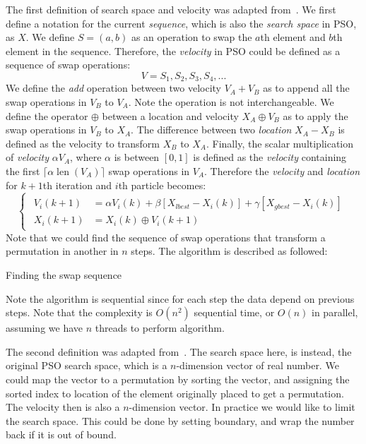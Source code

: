 \documentclass{article}
\begin{document}
The first definition of search space and velocity was adapted from~\cite{Clerc2004}. We first define a notation for the current \textit{sequence}, which is also the \textit{search space} in PSO, as \(X\). We define \(S=(a,b)\) as an operation to swap the \(a\)th element and \(b\)th element in the sequence. Therefore, the \textit{velocity} in PSO could be defined as a sequence of swap operations:
$$V = {S_1,S_2,S_3,S_4,...} $$
We define the \textit{add} operation  between two velocity \(V_A + V_B\) as to append all the swap operations in $V_B$ to $V_A$. Note the operation is not interchangeable. We define the operator $\oplus$ between a location and velocity \(X_A \oplus V_B\) as to apply the swap operations in $V_B$ to $X_A$. The difference between two \textit{location} $X_A-X_B$ is defined as the velocity to transform $X_B$ to $X_A$. Finally, the scalar multiplication of \textit{velocity} $\alpha V_A$, where $\alpha$ is between $[0,1]$ is defined as the \textit{velocity} containing the first $\lceil\alpha\operatorname{len}(V_A)\rceil$ swap operations in $V_A$.
Therefore the \textit{velocity} and \textit{location} for $k+1$th iteration and $i$th particle becomes:
\begin{equation}
    \begin{cases}
        \begin{split}
        V_i(k+1) &= \alpha V_i(k)+\beta [X_{lbest}-X_i(k)]+\gamma [X_{gbest}-X_i(k)]\\
        X_i(k+1) &= X_i(k)\oplus V_i(k+1)
        \end{split}
    \end{cases}
\end{equation}
Note that we could find the sequence of swap operations that transform a permutation in another in $n$ steps. The algorithm is described as followed:

\begin{algorithm}[H]
 \caption{Finding the swap sequence}
\end{algorithm}
Note the algorithm is sequential since for each step the data depend on previous steps. Note that the complexity is $O(n^2)$ sequential time, or $O(n)$ in parallel, assuming we have $n$ threads to perform algorithm.

The second definition was adapted from~\cite{1382191}. The search space here, is instead, the original PSO search space, which is a $n$-dimension vector of real number. We could map the vector to a permutation by sorting the vector, and assigning the sorted index to location of the element originally placed to get a permutation. The velocity then is also a $n$-dimension vector. In practice we would like to limit the search space. This could be done by setting boundary, and wrap the number back if it is out of bound.
\end{document}
